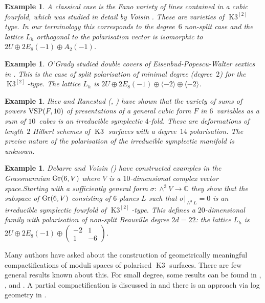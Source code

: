 \documentclass[a4paper,11pt]{article}
\newtheorem{example}[lemma]{Example}
\newcommand{\CC}{\mathbb C}
\newcommand{\VSP}{\mathop{\null\mathrm {VSP}}\nolimits}
\newcommand{\Gr}{\mathop{\null\mathrm {Gr}}\nolimits}
\newcommand{\latt}[1]{{\langle{#1}\rangle}}
\newcommand{\Kthree}{\mathop{\mathrm {K3}}\nolimits}
\begin{document}
\begin{example}\label{ex:voisin}
A classical case is the Fano variety of lines contained in a cubic
fourfold, which was studied in detail by Voisin \cite{Vo1}. These are
varieties of $\Kthree^{[2]}$ type. In our terminology this corresponds
to the degree~$6$ non-split case and the lattice $L_h$ orthogonal to
the polarisation vector is isomorphic to $2U \oplus 2E_8(-1) \oplus
A_2(-1)$.
\end{example}
\begin{example}\label{ex:ogradyEPW}
O'Grady studied double covers of
Eisenbud-Popescu-\-Wal\-ter sextics in \cite{OG4}. This is the case of split
polarisation of minimal degree (degree~$2$) for the
$\Kthree^{[2]}$-type. The lattice $L_h$ is $2U \oplus 2E_8(-1) \oplus
\latt{-2} \oplus \latt{-2}$.
\end{example}
\begin{example}\label{ex:ilievranestad}
Iliev and Ranestad (\cite {IR1}, \cite{IR2}) have shown that the
variety of sums of powers $\VSP(F,10)$ of presentations of a general
cubic form $F$ in $6$~variables as a sum of $10$~cubes is an
irreducible symplectic $4$-fold. These are deformations of length~$2$
Hilbert schemes of $\Kthree$ surfaces with a degree~$14$
polarisation. The precise nature of the polarisation of the irreducible
symplectic manifold is unknown.
\end{example}
\begin{example}\label{ex:debarrevoisin}
Debarre and Voisin (\cite{DV}) have constructed examples in the
Grassmannian $\Gr(6,V)$ where $V$ is a $10$-dimensional complex vector
space.Starting with a sufficiently general form $\sigma\colon \wedge^3
V \to \CC$ they show that the subspace of $\Gr(6,V)$ consisting of
$6$-planes $L$ such that $\sigma|_{\wedge^3 L} =0$ is an irreducible
symplectic fourfold of $\Kthree^{[2]}$-type. This defines a
$20$-dimensional family with polarisation of non-split Beauville
degree $2d=22$: the lattice $L_h$ is $2U \oplus 2E_8(-1)
\oplus \begin{pmatrix} -2 & 1\\ 1 &-6 \end{pmatrix}$.
\end{example}

Many authors have asked about the construction of geometrically
meaningful compactifications of moduli spaces of polarised $\Kthree$
surfaces. There are few general results known about this. For small
degree, some results can be found in \cite{Sha2}, \cite{Sha3},
\cite{St} and \cite{Sc}. A partial compactification is discussed in
\cite{Fr} and there is an approach via log geometry in \cite{Ol}.
\end{document}
